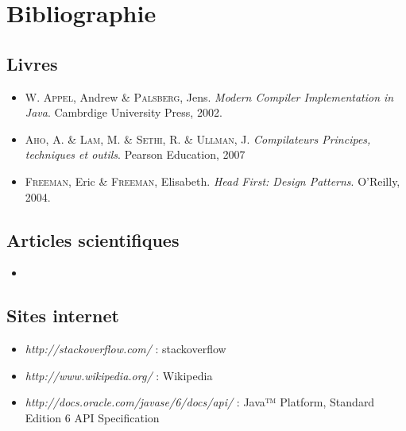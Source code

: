 \section*{Bibliographie} %

\subsection*{Livres}

\begin{itemize}
    \item \textsc{W. Appel}, Andrew \& \textsc{Palsberg}, Jens. \emph{Modern Compiler Implementation in Java}. Cambrdige University Press, 2002.
    \item \textsc{Aho}, A. \& \textsc{Lam}, M. \& \textsc{Sethi}, R. \& \textsc{Ullman}, J. \emph{Compilateurs Principes, techniques et outils}. Pearson Education, 2007
    \item \textsc{Freeman}, Eric \& \textsc{Freeman}, Elisabeth. \emph{Head First: Design Patterns}. O'Reilly, 2004.
\end{itemize}

\subsection*{Articles scientifiques}

\begin{itemize}
	\item
\end{itemize}

\subsection*{Sites internet}

\begin{itemize}
    \item \emph{http://stackoverflow.com/} : stackoverflow
    \item \emph{http://www.wikipedia.org/} : Wikipedia
    \item \emph{http://docs.oracle.com/javase/6/docs/api/} : 
        Java™ Platform, Standard Edition 6
        API Specification
\end{itemize}
